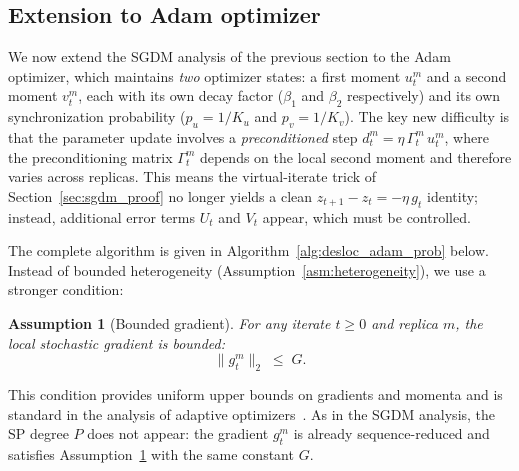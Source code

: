 \documentclass{article}
\newtheorem{assumption}{Assumption}[section]
\begin{document}
\subsection{Extension to Adam optimizer}
\label{sec:adam_extension}
\label{sec:high_prob}

We now extend the SGDM analysis of the previous section to the Adam optimizer,
which maintains \emph{two} optimizer states: a first moment $u_t^m$ and a second
moment $v_t^m$, each with its own decay factor ($\beta_1$ and $\beta_2$
respectively) and its own synchronization probability ($p_u = 1/K_u$ and
$p_v = 1/K_v$). The key new difficulty is that the parameter update involves a
\emph{preconditioned} step $d_t^m = \eta\,\Gamma_t^m\,u_t^m$, where the
preconditioning matrix $\Gamma_t^m$ depends on the local second moment and
therefore varies across replicas. This means the virtual-iterate trick of
Section~\ref{sec:sgdm_proof} no longer yields a clean $z_{t+1} - z_t = -\eta\,g_t$
identity; instead, additional error terms $U_t$ and $V_t$ appear, which must be
controlled.

The complete algorithm is given in Algorithm~\ref{alg:desloc_adam_prob} below.
Instead of bounded heterogeneity (Assumption~\ref{asm:heterogeneity}), we use a
stronger condition:

\begin{assumption}[Bounded gradient]
\label{ass:bounded_grad}
For any iterate $t \geq 0$ and replica $m$, the local stochastic gradient is
bounded:
\begin{equation}
\|g_t^m\|_2 \;\leq\; G.
\label{eq:bounded_grad}
\end{equation}
\end{assumption}

This condition provides uniform upper bounds on gradients and momenta and is
standard in the analysis of adaptive
optimizers~\citep{chen2019convergenceclassadamtypealgorithms,defossez2022simple,zhang2023adamconvergemodificationupdate}.
As in the SGDM analysis, the SP degree $P$ does not appear: the gradient
$g_t^m$ is already sequence-reduced and satisfies Assumption~\ref{ass:bounded_grad}
with the same constant $G$.
\end{document}
